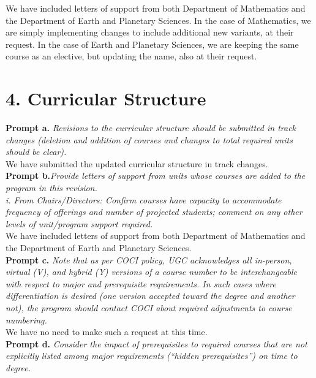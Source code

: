 \documentclass[12pt]{article}
\begin{document}
\noindent
We have included letters of support from both Department of
Mathematics and the Department of Earth and Planetary Sciences.  In
the case of Mathematics, we are simply implementing changes to include
additional new variants, at their request.  In the case of Earth and
Planetary Sciences, we are keeping the same course as an elective, but
updating the name, also at their request.

\section*{4. Curricular Structure}

\noindent
{\bf Prompt a.} {\it Revisions to the curricular structure should be submitted in track changes (deletion and addition of courses and changes to total required units should be clear).}\\

\noindent
We have submitted the updated curricular structure in track changes.\\

\noindent
{\bf Prompt b.}{\it Provide letters of support from units whose courses are added to the program in this revision.}\\
{\it i. From Chairs/Directors: Confirm courses have capacity to accommodate frequency of offerings and number of projected students; comment on any other levels of unit/program support required.}\\

\noindent
We have included letters of support from both Department of Mathematics and the Department of Earth and Planetary Sciences.\\

\noindent
{\bf Prompt c.}
{\it Note that as per COCI policy, UGC acknowledges all in-person, virtual (V), and hybrid (Y) versions of a course number to be interchangeable with respect to major and prerequisite requirements. In such cases where differentiation is desired (one version accepted toward the degree and another not), the program should contact COCI about required adjustments to course numbering.}\\

\noindent
We have no need to make such a request at this time.\\

\noindent
{\bf Prompt d.}
{\it Consider the impact of prerequisites to required courses that are not explicitly listed among major requirements (“hidden prerequisites”) on time to degree.}\\
\end{document}
